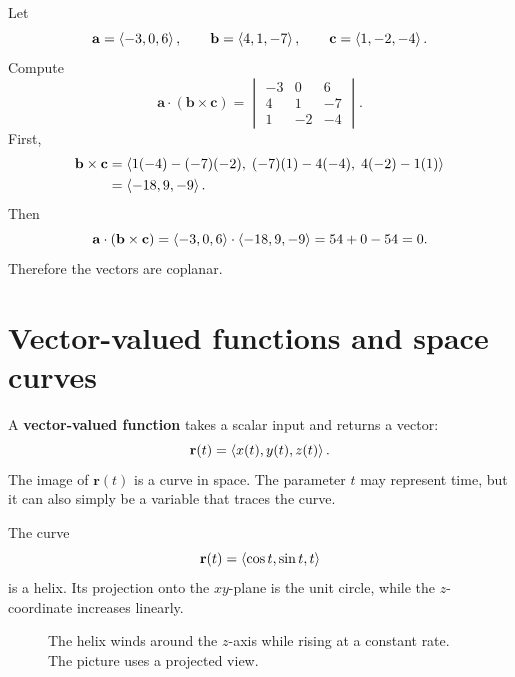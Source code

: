 \begin{examplebox}[title={Example 5.4: Test coplanarity}]
Let
\[
\mathbf a=\left\langle -3,0,6\right\rangle,\qquad
\mathbf b=\left\langle 4,1,-7\right\rangle,\qquad
\mathbf c=\left\langle 1,-2,-4\right\rangle.
\]
Compute
\[
\mathbf a\cdot(\mathbf b\times\mathbf c)
=
\begin{vmatrix}
-3&0&6\\
4&1&-7\\
1&-2&-4
\end{vmatrix}.
\]
First,
\[
\begin{aligned}
\mathbf b\times\mathbf c
&=\left\langle 1(-4)-(-7)(-2),\; (-7)(1)-4(-4),\;4(-2)-1(1)\right\rangle\\
&=\left\langle -18,9,-9\right\rangle.
\end{aligned}
\]
Then
\[
\mathbf a\cdot(\mathbf b\times\mathbf c)
=\left\langle -3,0,6\right\rangle\cdot\left\langle -18,9,-9\right\rangle=54+0-54=0.
\]
Therefore the vectors are coplanar.
\end{examplebox}

\section{Vector-valued functions and space curves}

\begin{definitionbox}[title={Vector-valued function}]
A \textbf{vector-valued function} takes a scalar input and returns a vector:
\[
\mathbf r(t)=\left\langle x(t),y(t),z(t)\right\rangle.
\]
The image of $\mathbf r(t)$ is a curve in space. The parameter $t$ may represent time, but it can also simply be a variable that traces the curve.
\end{definitionbox}

\begin{examplebox}[title={Example 5.5: A helix}]
The curve
\[
\mathbf r(t)=\left\langle \cos t,\sin t,t\right\rangle
\]
is a helix. Its projection onto the $xy$-plane is the unit circle, while the $z$-coordinate increases linearly.
\end{examplebox}

\begin{figure}[H]
\centering
{}
\caption{The helix winds around the $z$-axis while rising at a constant rate. The picture uses a projected view.}
\label{fig:helix}
\end{figure}

